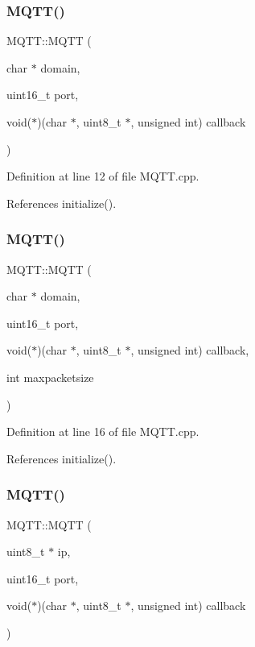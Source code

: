 \subsubsection{\texorpdfstring{M\+Q\+T\+T()}{MQTT()}\hspace{0.1cm}{\footnotesize\ttfamily [2/9]}}
{\footnotesize\ttfamily M\+Q\+T\+T\+::\+M\+Q\+TT (\begin{DoxyParamCaption}\item[{char $\ast$}]{domain,  }\item[{uint16\+\_\+t}]{port,  }\item[{void($\ast$)(char $\ast$, uint8\+\_\+t $\ast$, unsigned int)}]{callback }\end{DoxyParamCaption})}



Definition at line 12 of file M\+Q\+T\+T.\+cpp.



References initialize().

\mbox{\label{class_m_q_t_t_a95dc3446cd91fd3448c3fe3938a40f72}} 
\subsubsection{\texorpdfstring{M\+Q\+T\+T()}{MQTT()}\hspace{0.1cm}{\footnotesize\ttfamily [3/9]}}
{\footnotesize\ttfamily M\+Q\+T\+T\+::\+M\+Q\+TT (\begin{DoxyParamCaption}\item[{char $\ast$}]{domain,  }\item[{uint16\+\_\+t}]{port,  }\item[{void($\ast$)(char $\ast$, uint8\+\_\+t $\ast$, unsigned int)}]{callback,  }\item[{int}]{maxpacketsize }\end{DoxyParamCaption})}



Definition at line 16 of file M\+Q\+T\+T.\+cpp.



References initialize().

\mbox{\label{class_m_q_t_t_a0e4560eca8b493628aed67f949b45d42}} 
\subsubsection{\texorpdfstring{M\+Q\+T\+T()}{MQTT()}\hspace{0.1cm}{\footnotesize\ttfamily [4/9]}}
{\footnotesize\ttfamily M\+Q\+T\+T\+::\+M\+Q\+TT (\begin{DoxyParamCaption}\item[{uint8\+\_\+t $\ast$}]{ip,  }\item[{uint16\+\_\+t}]{port,  }\item[{void($\ast$)(char $\ast$, uint8\+\_\+t $\ast$, unsigned int)}]{callback }\end{DoxyParamCaption})}



